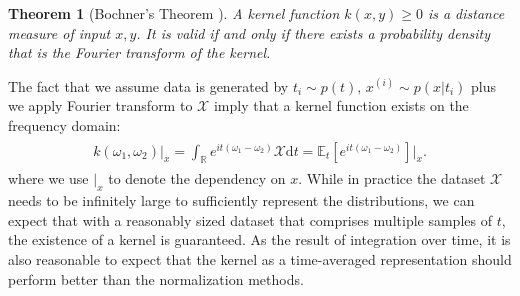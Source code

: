 \documentclass[sigconf,anonymous,review]{acmart}
\newtheorem{myTheo}{\textbf{Theorem}}
\newcommand{\expectation}[2]{\mathbb{E}_{#1}\left[#2\right]}
\begin{document}


\begin{myTheo} [Bochner's Theorem \citep{Scholkopf-kernel}]\label{thm:bochner}
A kernel function $k(x, y) \geq 0$ is a distance measure of input $x, y$.
It is valid if and only if there exists a probability density that is the Fourier transform of the kernel.
\end{myTheo}
The fact that we assume data is generated by $t_i \sim p(t),\,x^{(i)} \sim p(x | t_i)$ plus we apply Fourier transform to $\mathcal{X}$ imply that a kernel function exists on the frequency domain:
\begin{align}
\label{eqn:bochner}
\begin{split}
    k(\omega_1, \omega_2)|_x  = \int_{\mathbb{R}}e^{i t(\omega_1 - \omega_2)} \mathcal{X} \mathrm{d}t = \expectation{t}{e^{i t(\omega_1 - \omega_2)}}\bigg|_x.
    \end{split}
\end{align}
where we use $|_x$ to denote the dependency on $x$. 
While in practice the dataset $\mathcal{X}$ needs to be infinitely large to sufficiently represent the distributions, we can expect that with a reasonably sized dataset that comprises multiple samples of $t$, the existence of a kernel is guaranteed.
As the result of integration over time, it is also reasonable to expect that the kernel as a time-averaged representation should perform better than the normalization methods.
\end{document}
